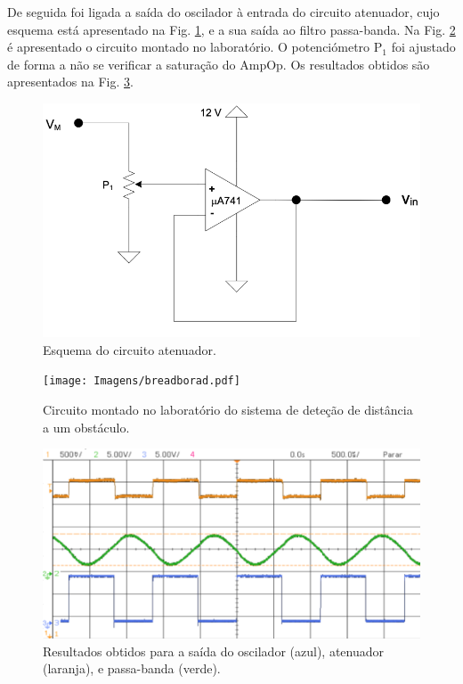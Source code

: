 De seguida foi ligada a saída do oscilador à entrada do circuito atenuador, cujo esquema está apresentado na Fig. \ref{fig:atenuador}, e a sua saída ao filtro passa-banda. Na Fig. \ref{fig:breadbord} é apresentado o circuito montado no laboratório. O potenciómetro $\mathrm{P}_1$ foi ajustado de forma a não se verificar a saturação do AmpOp. Os resultados obtidos são apresentados na Fig. \ref{fig:res_ocl_atn_flt}.

\begin{figure}[h!]
    \centering
    \includegraphics[width = 0.7 \textwidth]{Imagens/atenuador.png}
    \caption{Esquema do circuito atenuador.}
    \label{fig:atenuador}
\end{figure}

\begin{figure}[h!]
    \centering
    \texttt{[image: Imagens/breadborad.pdf]}
    \caption{Circuito montado no laboratório do sistema de deteção de distância a um obstáculo.}
    \label{fig:breadbord}
\end{figure}

\begin{figure}[h!]
    \centering
    \includegraphics[width = 0.7 \textwidth]{Imagens/ocl_atn_flt.png}
    \caption{Resultados obtidos para a saída do oscilador (azul), atenuador (laranja), e passa-banda (verde).}
    \label{fig:res_ocl_atn_flt}
\end{figure}


